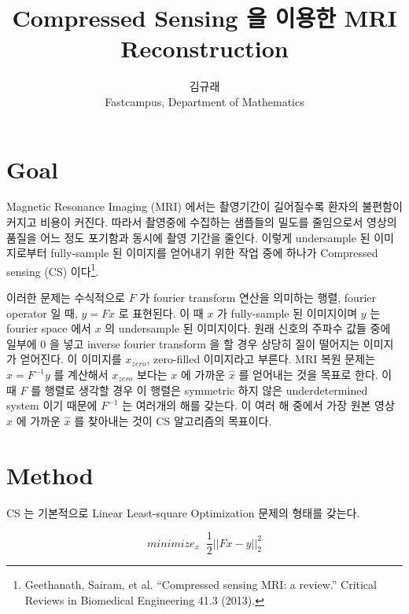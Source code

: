 \documentclass[twoside]{article}
\title{\vspace{-15mm}\fontsize{24pt}{10pt}\selectfont\textbf{
    Compressed Sensing 을 이용한 MRI Reconstruction
  }} %
\author{
\large
\textsc{김규래}\\[2mm] %
\normalsize Fastcampus, Department of Mathematics   \\ %
\vspace{-5mm}
}
\date{}
\begin{document}
\maketitle %

\thispagestyle{fancy} %






\section{Goal}
Magnetic Resonance Imaging (MRI) 에서는 촬영기간이 길어질수록 환자의 불편함이 커지고 비용이 커진다.
따라서 촬영중에 수집하는 샘플들의 밀도를 줄임으로서 영상의 품질을 어느 정도 포기함과 동시에 촬영 기간을 줄인다.
이렇게 undersample 된 이미지로부터 fully-sample 된 이미지를 얻어내기 위한 작업 중에 하나가 Compressed sensing (CS) 이다\footnote{Geethanath, Sairam, et al. ``Compressed sensing MRI: a review.'' Critical Reviews in Biomedical Engineering 41.3 (2013).}.

이러한 문제는 수식적으로 $F$ 가 fourier transform 연산을 의미하는 행렬, fourier operator 일 때, $y = Fx$ 로 표현된다.
이 때 $x$ 가 fully-sample 된 이미지이며 $y$ 는 fourier space 에서 $x$ 의 undersample 된 이미지이다.
원래 신호의 주파수 값들 중에 일부에 0 을 넣고 inverse fourier transform 을 할 경우 상당히 질이 떨어지는 이미지가 얻어진다.
이 이미지를 $x_{zero}$, zero-filled 이미지라고 부른다.
MRI 복원 문제는 $\hat{x} = F^{-1}y$ 를 계산해서 $x_{zero}$ 보다는 $x$ 에 가까운 $\hat{x}$ 를 얻어내는 것을 목표로 한다.
이 때 $F$ 를 행렬로 생각할 경우 이 행렬은 symmetric 하지 않은 underdetermined system 이기 때문에 $F^{-1}$ 는 여러개의 해를 갖는다.
이 여러 해 중에서 가장 원본 영상 $x$ 에 가까운 $\hat{x}$ 를 찾아내는 것이 CS 알고리즘의 목표이다.

\section{Method}

CS 는 기본적으로 Linear Least-square Optimization 문제의 형태를 갖는다.

\begin{equation}
  minimize_x \;\; \frac{1}{2} || Fx - y ||_2^2
\end{equation}
\end{document}
